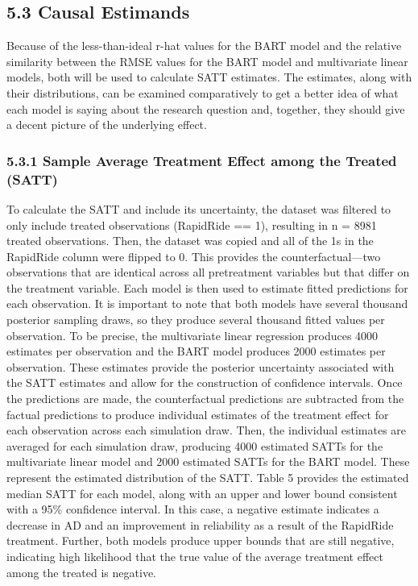 \documentclass[
  12pt,
]{article}
\begin{document}
\subsection{5.3 Causal Estimands}\label{causal-estimands}

Because of the less-than-ideal r-hat values for the BART model and the
relative similarity between the RMSE values for the BART model and
multivariate linear models, both will be used to calculate SATT
estimates. The estimates, along with their distributions, can be
examined comparatively to get a better idea of what each model is saying
about the research question and, together, they should give a decent
picture of the underlying effect.

\subsubsection{5.3.1 Sample Average Treatment Effect among the Treated
(SATT)}\label{sample-average-treatment-effect-among-the-treated-satt}

To calculate the SATT and include its uncertainty, the dataset was
filtered to only include treated observations (RapidRide == 1),
resulting in n = 8981 treated observations. Then, the dataset was copied
and all of the 1s in the RapidRide column were flipped to 0. This
provides the counterfactual---two observations that are identical across
all pretreatment variables but that differ on the treatment variable.
Each model is then used to estimate fitted predictions for each
observation. It is important to note that both models have several
thousand posterior sampling draws, so they produce several thousand
fitted values per observation. To be precise, the multivariate linear
regression produces 4000 estimates per observation and the BART model
produces 2000 estimates per observation. These estimates provide the
posterior uncertainty associated with the SATT estimates and allow for
the construction of confidence intervals. Once the predictions are made,
the counterfactual predictions are subtracted from the factual
predictions to produce individual estimates of the treatment effect for
each observation across each simulation draw. Then, the individual
estimates are averaged for each simulation draw, producing 4000
estimated SATTs for the multivariate linear model and 2000 estimated
SATTs for the BART model. These represent the estimated distribution of
the SATT. Table 5 provides the estimated median SATT for each model,
along with an upper and lower bound consistent with a 95\% confidence
interval. In this case, a negative estimate indicates a decrease in AD
and an improvement in reliability as a result of the RapidRide
treatment. Further, both models produce upper bounds that are still
negative, indicating high likelihood that the true value of the average
treatment effect among the treated is negative.
\end{document}
